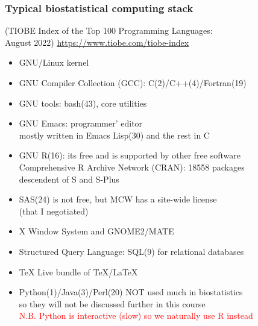 \documentclass[11pt,pdftex,dvipsnames,usenames,helvetica]{beamer}
\newcommand*{\red}[1]{\textcolor{red}{#1}}
\begin{document}
\begin{frame}
\frametitle{Typical biostatistical computing stack}
(TIOBE Index of the Top 100 Programming Languages:\\ 
August 2022)
\url{https://www.tiobe.com/tiobe-index}

\begin{itemize}
\item GNU/Linux kernel
\item GNU Compiler Collection (GCC): C(2)/C++(4)/Fortran(19)
\item GNU tools: bash(43), core utilities
\item GNU Emacs: programmer' editor \\
mostly written in Emacs Lisp(30) and the rest in C
\item GNU R(16): its free and is supported by other free software\\
Comprehensive R Archive Network (CRAN): 18558 packages\\
descendent of S and S-Plus
\item SAS(24) is not free, but MCW has a site-wide license\\
(that I negotiated)
\item X Window System and GNOME2/MATE
\item Structured Query Language: SQL(9) for relational databases
\item TeX Live bundle of TeX/LaTeX 
\item Python(1)/Java(3)/Perl(20) NOT used much in biostatistics\\
so they will not be discussed further in this course\\
\red{N.B. Python is interactive (slow) so we naturally use R instead}
\end{itemize}

\end{frame}
\end{document}

